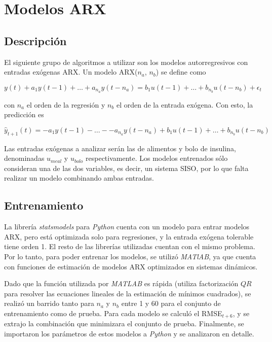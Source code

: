 
\section{Modelos ARX}

\subsection{Descripción}

El siguiente grupo de algoritmos a utilizar son los modelos autorregresivos con entradas exógenas ARX. Un modelo ARX($n_a$, $n_b$) se define como

\begin{equation}
	y(t) + a_1 y(t-1) + \dots  + a_{n_a}y(t-n_a) = 
	b_1 u(t-1) + \dots + b_{n_b} u(t-n_b) +\epsilon_t
\end{equation}

con $n_a$ el orden de la regresión y $n_b$ el orden de la entrada exógena. Con esto, la predicción es

\begin{equation}
	\hat{y}_{t+1}(t) = -a_1 y(t-1) - \dots - -a_{n_a} y(t-n_a) 
	+ b_1 u(t-1) + \dots + b_{n_b} u(t-n_b)
\end{equation}

Las entradas exógenas a analizar serán las de alimentos y bolo de insulina, denominadas $u_{meal}$ y $u_{bolo}$ respectivamente. Los modelos entrenados sólo consideran una de las dos variables, es decir, un sistema SISO, por lo que falta realizar un modelo combinando ambas entradas.


\subsection{Entrenamiento}

La librería \emph{statsmodels} para \emph{Python}  cuenta con un modelo para entrar modelos ARX, pero está optimizada solo para regresiones, y la entrada exógena tolerable tiene orden 1. El resto de las librerías utilizadas cuentan con el mismo problema. Por lo tanto, para poder entrenar los modelos, se utilizó \emph{MATlAB}, ya que cuenta con funciones de estimación de modelos ARX optimizados en sistemas dinámicos.

Dado que la función utilizada por \emph{MATLAB} es rápida (utiliza factorización $QR$ para resolver las ecuaciones lineales de la estimación de mínimos cuadrados), se realizó un barrido tanto para $n_a$ y $n_b$ entre 1 y 60 para el conjunto de entrenamiento como de prueba. Para cada modelo se calculó el RMSE$_{t+6}$, y se extrajo la combinación que minimizara el conjunto de prueba. Finalmente, se importaron los parámetros de estos modelos a \emph{Python} y se analizaron en detalle.

